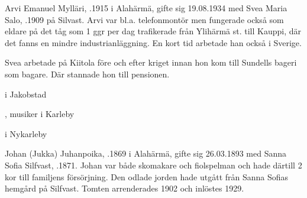 %


%
Arvi Emanuel Mylläri, .1915 i Alahärmä, gifte sig 19.08.1934 med Svea Maria Salo, .1909 på Silvast. Arvi var bl.a. telefonmontör men fungerade också som eldare på det tåg som 1 ggr per dag trafikerade från Ylihärmä st. till Kauppi, där det fanns en mindre industrianläggning. En kort tid arbetade han också i Sverige.

Svea arbetade på Kiitola före och efter kriget innan hon kom till Sundells bageri som bagare. Där stannade hon till pensionen.
\begin{jhchildren}
  \item {} i Jakobstad
  \item {}, musiker i Karleby
  \item {} i Nykarleby
\end{jhchildren}


%
Johan (Jukka) Juhanpoika, .1869 i Alahärmä, gifte sig 26.03.1893 med Sanna Sofia Silfvast, .1871. Johan var både skomakare och fiolspelman och hade därtill 2 kor till familjens försörjning. Den odlade jorden hade utgått från Sanna Sofias hemgård på Silfvast. Tomten arrenderades 1902 och inlöstes 1929.
\begin{jhchildren}
  \item {}
  \item {}
  \item {}
  \item {}
  \item {}
  \item {}
\end{jhchildren}




